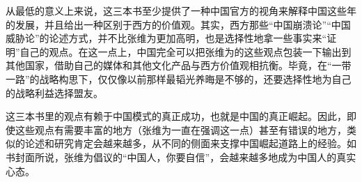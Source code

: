 从最低的意义上来说，这三本书至少提供了一种中国官方的视角来解释中国这些年的发展，并且给出一种区别于西方的价值观。其实，西方那些“中国崩溃论”“中国威胁论”的论述方式，并不比张维为更加高明，也是选择性地拿一些事实来“证明”自己的观点。在这一点上，中国完全可以把张维为的这些观点包装一下输出到其他国家，借助自己的媒体和其他文化产品与西方价值观相抗衡。毕竟，在“一带一路”的战略构思下，仅仅像以前那样最韬光养晦是不够的，还要选择性地为自己的战略利益选择盟友。

这三本书里的观点有赖于中国模式的真正成功，也就是中国的真正崛起。因此，即使这些观点有需要丰富的地方（张维为一直在强调这一点）甚至有错误的地方，类似的论述和研究肯定会越来越多，从不同的侧面来支撑中国崛起道路上的经验。如书封面所说，张维为倡议的“中国人，你要自信”，会越来越多地成为中国人的真实 心态。
